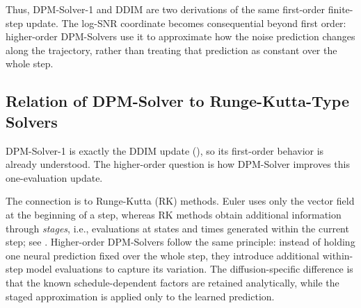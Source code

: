 
Thus, DPM-Solver-1 and DDIM are two derivations of the same first-order
finite-step update. The log-SNR coordinate becomes consequential beyond first
order: higher-order DPM-Solvers use it to approximate how the noise prediction
changes along the trajectory, rather than treating that prediction as constant
over the whole step.


\subsection{Relation of DPM-Solver to Runge-Kutta-Type Solvers}
\label{subsec:dpm-rk}

DPM-Solver-1 is exactly the DDIM update
(), so its first-order behavior is already
understood. The higher-order question is how DPM-Solver improves this
one-evaluation update.

The connection is to Runge-Kutta (RK) methods. Euler uses only the vector
field at the beginning of a step, whereas RK methods obtain additional
information through \emph{stages}, i.e., evaluations at states and times
generated within the current step; see .
Higher-order DPM-Solvers follow the same principle: instead of holding one
neural prediction fixed over the whole step, they introduce additional
within-step model evaluations to capture its variation. The diffusion-specific
difference is that the known schedule-dependent factors are retained
analytically, while the staged approximation is applied only to the learned
prediction.

